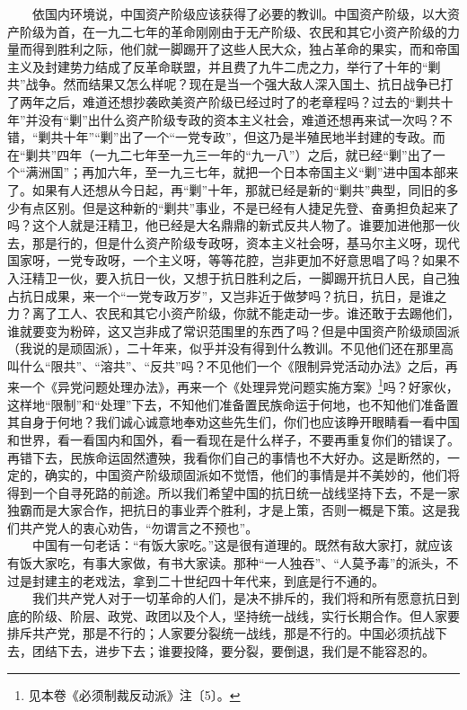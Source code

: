 \documentclass[cn,11pt,chinese]{elegantbook}
\begin{document}
　　依国内环境说，中国资产阶级应该获得了必要的教训。中国资产阶级，以大资产阶级为首，在一九二七年的革命刚刚由于无产阶级、农民和其它小资产阶级的力量而得到胜利之际，他们就一脚踢开了这些人民大众，独占革命的果实，而和帝国主义及封建势力结成了反革命联盟，并且费了九牛二虎之力，举行了十年的“剿共”战争。然而结果又怎么样呢？现在是当一个强大敌人深入国土、抗日战争已打了两年之后，难道还想抄袭欧美资产阶级已经过时了的老章程吗？过去的“剿共十年”并没有“剿”出什么资产阶级专政的资本主义社会，难道还想再来试一次吗？不错，“剿共十年”“剿”出了一个“一党专政”，但这乃是半殖民地半封建的专政。而在“剿共”四年（一九二七年至一九三一年的“九一八”）之后，就已经“剿”出了一个“满洲国”；再加六年，至一九三七年，就把一个日本帝国主义“剿”进中国本部来了。如果有人还想从今日起，再“剿”十年，那就已经是新的“剿共”典型，同旧的多少有点区别。但是这种新的“剿共”事业，不是已经有人捷足先登、奋勇担负起来了吗？这个人就是汪精卫，他已经是大名鼎鼎的新式反共人物了。谁要加进他那一伙去，那是行的，但是什么资产阶级专政呀，资本主义社会呀，基马尔主义呀，现代国家呀，一党专政呀，一个主义呀，等等花腔，岂非更加不好意思唱了吗？如果不入汪精卫一伙，要入抗日一伙，又想于抗日胜利之后，一脚踢开抗日人民，自己独占抗日成果，来一个“一党专政万岁”，又岂非近于做梦吗？抗日，抗日，是谁之力？离了工人、农民和其它小资产阶级，你就不能走动一步。谁还敢于去踢他们，谁就要变为粉碎，这又岂非成了常识范围里的东西了吗？但是中国资产阶级顽固派（我说的是顽固派），二十年来，似乎并没有得到什么教训。不见他们还在那里高叫什么“限共”、“溶共”、“反共”吗？不见他们一个《限制异党活动办法》之后，再来一个《异党问题处理办法》，再来一个《处理异党问题实施方案》\footnote[18]{ 见本卷《必须制裁反动派》注〔5〕。}吗？好家伙，这样地“限制”和“处理”下去，不知他们准备置民族命运于何地，也不知他们准备置其自身于何地？我们诚心诚意地奉劝这些先生们，你们也应该睁开眼睛看一看中国和世界，看一看国内和国外，看一看现在是什么样子，不要再重复你们的错误了。再错下去，民族命运固然遭殃，我看你们自己的事情也不大好办。这是断然的，一定的，确实的，中国资产阶级顽固派如不觉悟，他们的事情是并不美妙的，他们将得到一个自寻死路的前途。所以我们希望中国的抗日统一战线坚持下去，不是一家独霸而是大家合作，把抗日的事业弄个胜利，才是上策，否则一概是下策。这是我们共产党人的衷心劝告，“勿谓言之不预也”。\\
　　中国有一句老话：“有饭大家吃。”这是很有道理的。既然有敌大家打，就应该有饭大家吃，有事大家做，有书大家读。那种“一人独吞”、“人莫予毒”的派头，不过是封建主的老戏法，拿到二十世纪四十年代来，到底是行不通的。\\
　　我们共产党人对于一切革命的人们，是决不排斥的，我们将和所有愿意抗日到底的阶级、阶层、政党、政团以及个人，坚持统一战线，实行长期合作。但人家要排斥共产党，那是不行的；人家要分裂统一战线，那是不行的。中国必须抗战下去，团结下去，进步下去；谁要投降，要分裂，要倒退，我们是不能容忍的。\\
\end{document}
